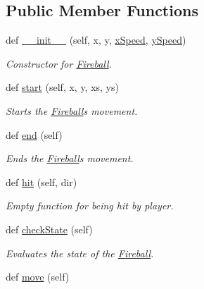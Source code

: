 \subsection*{Public Member Functions}
\begin{DoxyCompactItemize}
\item 
def \hyperlink{classactor_1_1fireball_1_1_fireball_a8e8de406c4754cea725b3800053bbabc}{\+\_\+\+\_\+init\+\_\+\+\_\+} (self, x, y, \hyperlink{classactor_1_1fireball_1_1_fireball_a6708bc69526dffd73c714657dbfa0625}{x\+Speed}, \hyperlink{classactor_1_1fireball_1_1_fireball_a87f95efd62b2ebc27b5f742d9ae50ca6}{y\+Speed})
\begin{DoxyCompactList}\small\item\em Constructor for \hyperlink{classactor_1_1fireball_1_1_fireball}{Fireball}. \end{DoxyCompactList}\item 
def \hyperlink{classactor_1_1fireball_1_1_fireball_a5a93196e521c8cca75aac1dc7f9080a4}{start} (self, x, y, xs, ys)
\begin{DoxyCompactList}\small\item\em Starts the \hyperlink{classactor_1_1fireball_1_1_fireball}{Fireball}\textquotesingle{}s movement. \end{DoxyCompactList}\item 
def \hyperlink{classactor_1_1fireball_1_1_fireball_ab4e6a41b951134c42579f056ab0b4d43}{end} (self)
\begin{DoxyCompactList}\small\item\em Ends the \hyperlink{classactor_1_1fireball_1_1_fireball}{Fireball}\textquotesingle{}s movement. \end{DoxyCompactList}\item 
def \hyperlink{classactor_1_1fireball_1_1_fireball_a21e2ae2502f54f7a247f9201c167bc5e}{hit} (self, dir)
\begin{DoxyCompactList}\small\item\em Empty function for being hit by player. \end{DoxyCompactList}\item 
def \hyperlink{classactor_1_1fireball_1_1_fireball_abf7cee468c753aa1ed23bd45cd7a7bdc}{check\+State} (self)
\begin{DoxyCompactList}\small\item\em Evaluates the state of the \hyperlink{classactor_1_1fireball_1_1_fireball}{Fireball}. \end{DoxyCompactList}\item 
def \hyperlink{classactor_1_1fireball_1_1_fireball_a7eca2eb84a6f46f23df4a092edd044ac}{move} (self)

\end{DoxyCompactItemize}
